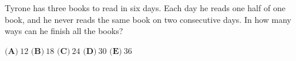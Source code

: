 Tyrone has three books to read in six days. Each day he reads one half of one book, and he never reads the same book on two consecutive days. In how many ways can he finish all the books?

$\textbf{(A)}\ $$12$ \qquad $\textbf{(B)}\ $$18$ \qquad $\textbf{(C)}\ $$24$ \qquad $\textbf{(D)}\ $$30$ \qquad $\textbf{(E)}\ $$36$
